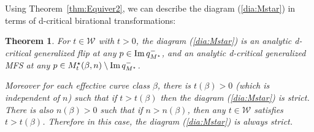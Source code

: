 \documentclass[11pt]{amsart}
\theoremstyle{plain}
\newtheorem{thm}{Theorem}[section]
\theoremstyle{definition}
\theoremstyle{remark}
\newcommand{\wW}{\mathcal{W}}
\newcommand{\Imm}{\mathop{\rm Im}\nolimits}
\begin{document}
Using Theorem~\ref{thm:Equiver2}, 
we can describe the diagram (\ref{dia:Mstar})
in terms of d-critical birational transformations:
\begin{thm}\label{thm:starflip}
For $t \in \wW$ with $t>0$, 
the diagram (\ref{dia:Mstar}) is an 
analytic d-critical generalized flip at 
any $p \in \Imm q_{M^{\star}}^-$, 
and an analytic d-critical generalized MFS 
at any $p \in M_t^{\star}(\beta, n) \setminus \Imm q_{M^{\star}}^-$. 

Moreover for each effective curve class $\beta$, there is 
$t(\beta)>0$ (which is independent of $n$)
such that if $t>t(\beta)$ 
then the diagram (\ref{dia:Mstar}) is strict. 
There is also $n(\beta)>0$ such that 
if $n>n(\beta)$, then any $t \in \wW$ satisfies $t>t(\beta)$. 
Therefore in this case, the diagram (\ref{dia:Mstar}) is always strict. 
\end{thm}
\end{document}
